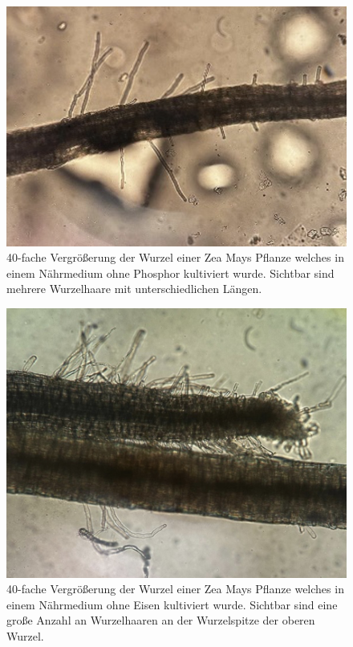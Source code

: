 \documentclass[10pt,a4paper]{article}
\begin{document}
		\begin{figure}[H]
			\centering
			\includegraphics[scale=0.5]{P_minuswurzel}
			\caption{40-fache Vergrößerung der Wurzel einer Zea Mays Pflanze welches in einem Nährmedium ohne Phosphor kultiviert wurde. Sichtbar sind mehrere Wurzelhaare mit unterschiedlichen Längen.}
			\label{fig:wurzel ohne P}
		\end{figure}
		
		
		\begin{figure}[H]
			\centering
			\includegraphics[scale=0.5]{Fe_minus}
			\caption{40-fache Vergrößerung der Wurzel einer Zea Mays Pflanze welches in einem Nährmedium ohne Eisen kultiviert wurde. Sichtbar sind eine große Anzahl an Wurzelhaaren an der Wurzelspitze der oberen Wurzel.}
			\label{fig:wurzel ohne Fe}
		\end{figure}
		
\end{document}
